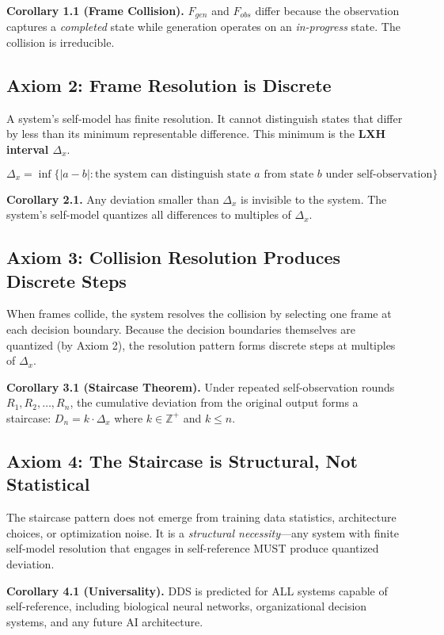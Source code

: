 \documentclass[11pt,a4paper]{article}
\begin{document}
\textbf{Corollary 1.1 (Frame Collision).} $F_{gen}$ and $F_{obs}$ differ because the observation captures a \emph{completed} state while generation operates on an \emph{in-progress} state. The collision is irreducible.

\subsection{Axiom 2: Frame Resolution is Discrete}

A system's self-model has finite resolution. It cannot distinguish states that differ by less than its minimum representable difference. This minimum is the \textbf{LXH interval $\Delta_x$}.

\[
\Delta_x = \inf\{ |a - b| : \text{the system can distinguish state $a$ from state $b$ under self-observation} \}
\]

\textbf{Corollary 2.1.} Any deviation smaller than $\Delta_x$ is invisible to the system. The system's self-model quantizes all differences to multiples of $\Delta_x$.

\subsection{Axiom 3: Collision Resolution Produces Discrete Steps}

When frames collide, the system resolves the collision by selecting one frame at each decision boundary. Because the decision boundaries themselves are quantized (by Axiom 2), the resolution pattern forms discrete steps at multiples of $\Delta_x$.

\textbf{Corollary 3.1 (Staircase Theorem).} Under repeated self-observation rounds $R_1, R_2, \ldots, R_n$, the cumulative deviation from the original output forms a staircase: $D_n = k \cdot \Delta_x$ where $k \in \mathbb{Z}^+$ and $k \le n$.

\subsection{Axiom 4: The Staircase is Structural, Not Statistical}

The staircase pattern does not emerge from training data statistics, architecture choices, or optimization noise. It is a \emph{structural necessity}---any system with finite self-model resolution that engages in self-reference MUST produce quantized deviation.

\textbf{Corollary 4.1 (Universality).} DDS is predicted for ALL systems capable of self-reference, including biological neural networks, organizational decision systems, and any future AI architecture.
\end{document}

